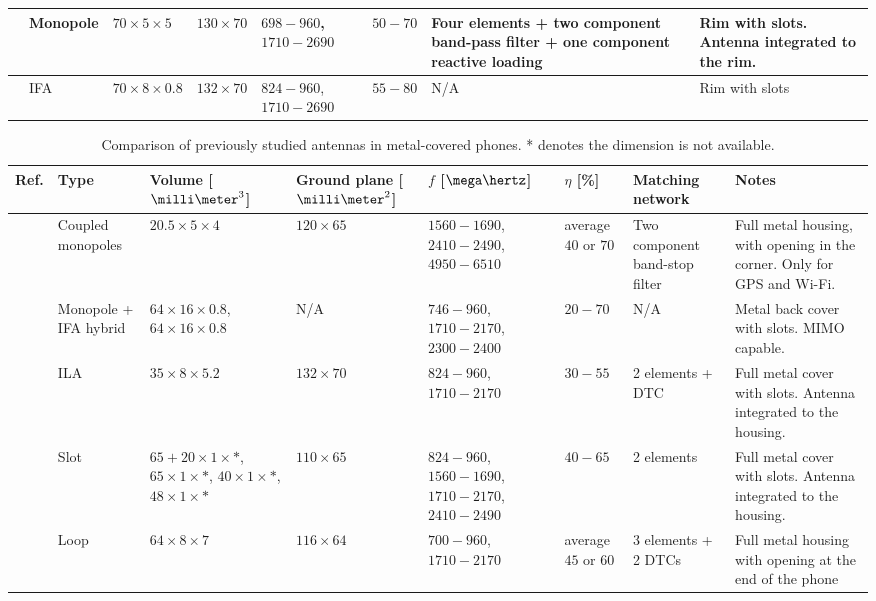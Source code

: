 \begin{table}
\begin{tabular}{|M{0.03\textheight}|M{0.11\textheight}|M{0.11\textheight}|M{0.11\textheight}|M{0.1\textheight}|M{0.06\textheight}|M{0.15\textheight}|>{\Centering\hspace*{0pt}}M{0.18\textheight}|}
    \hline
    \cite{chen_metal_frame} & Monopole & $70\times5\times5$ & $130\times70$ & $698-960$, $1710-2690$ & $50-70$ & Four elements + two component band-pass filter + one component reactive loading & Rim with slots. Antenna integrated to the rim.\\
    \hline
    \cite{hepta_ifa} & IFA & $70\times8\times0.8$ & $132\times70$ & $824-960$, $1710-2690$ & $55-80$ & N/A & Rim with slots\\
    \hline
\end{tabular}
\end{table}

\begin{table}
\centering
\caption{Comparison of previously studied antennas in metal-covered phones. * denotes the dimension is not available.}
\label{tab:metal_cover_comp}
\begin{tabular}{|M{0.03\textheight}|M{0.11\textheight}|M{0.11\textheight}|M{0.11\textheight}|M{0.1\textheight}|M{0.07\textheight}|M{0.15\textheight}|M{0.18\textheight}|}
    \hline
    \textbf{Ref.} & \textbf{Type} & \textbf{Volume [$\milli\meter^3$]} & \textbf{Ground plane [$\milli\meter^2$]} & \textbf{$f$ [$\mega\hertz$]} & \textbf{$\eta$ [\%]} & \textbf{Matching network} & \textbf{Notes}\\
    \hline
    \cite{wu_pier} & Coupled monopoles & $20.5\times5\times4$ & $120\times65$ & $1560-1690$, $2410-2490$, $4950-6510$ & average $40$ or $70$ & Two component band-stop filter & Full metal housing, with opening in the corner. Only for GPS and Wi-Fi.\\
    \hline
    \cite{son_wideband_mimo} & Monopole + IFA hybrid & $64\times16\times0.8$, $64\times16\times0.8$ & N/A & $746-960$, $1710-2170$, $2300-2400$ & $20-70$ & N/A & Metal back cover with slots. MIMO capable.\\
    \hline
    \cite{wu_tunable} & ILA & $35\times8\times5.2$ & $132\times70$ & $824-960$, $1710-2170$ & $30-55$ & 2 elements + DTC & Full metal cover with slots. Antenna integrated to the housing.\\
    \hline
    \cite{zhong_pier} & Slot & $65+20\times1\times*$, $65\times1\times*$, $40\times1\times*$, $48\times1\times*$ & $110\times65$ & $824-960$, $1560-1690$, $1710-2170$, $2410-2490$ & $40-65$ & 2 elements & Full metal cover with slots. Antenna integrated to the housing.\\
    \hline
    \cite{chen_compact_lte} & Loop & $64\times8\times7$ & $116\times64$ & $700-960$, $1710-2170$ & average $45$ or $60$ & 3 elements + 2 DTCs & Full metal housing with opening at the end of the phone\\
    \hline
\end{tabular}
\end{table}

\clearpage
